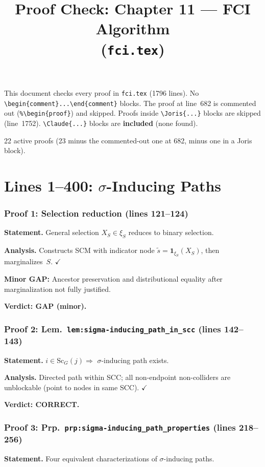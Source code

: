 \documentclass{article}
\title{Proof Check: Chapter 11 --- FCI Algorithm\\(\texttt{fci.tex})}
\date{}
\begin{document}
\maketitle

This document checks every proof in \texttt{fci.tex} (1796 lines).
No \verb|\begin{comment}...\end{comment}| blocks.
The proof at line~682 is commented out (\verb|%\begin{proof}|) and skipped.
Proofs inside \verb|\Joris{...}| blocks are skipped (line~1752).
\verb|\Claude{...}| blocks are \textbf{included} (none found).

22 active proofs (23 minus the commented-out one at 682, minus one in a Joris block).

\part*{Lines 1--400: $\sigma$-Inducing Paths}

\section{Proof 1: Selection reduction (lines 121--124)}
\textbf{Statement.} General selection $X_S\in\xi_S$ reduces to binary selection.

\textbf{Analysis.} Constructs SCM with indicator node $\tilde s=\mathbf{1}_{\xi_S}(X_S)$,
then marginalizes~$S$.  $\checkmark$

\textbf{Minor GAP:} Ancestor preservation and distributional equality after
marginalization not fully justified.

\textbf{Verdict: GAP (minor).}

\section{Proof 2: Lem.\ \texttt{lem:sigma-inducing\_path\_in\_scc} (lines 142--143)}
\textbf{Statement.} $i\in\mathrm{Sc}_G(j)\Rightarrow$ $\sigma$-inducing path exists.

\textbf{Analysis.} Directed path within SCC; all non-endpoint non-colliders are
unblockable (point to nodes in same SCC).  $\checkmark$

\textbf{Verdict: CORRECT.}

\section{Proof 3: Prp.\ \texttt{prp:sigma-inducing\_path\_properties} (lines 218--256)}
\textbf{Statement.} Four equivalent characterizations of $\sigma$-inducing paths.
\end{document}
